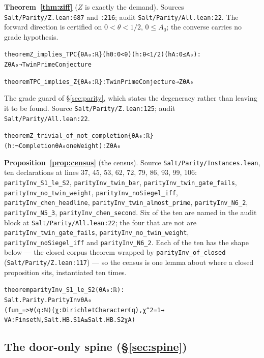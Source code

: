 \documentclass{CUP-JNL-FMP}
\newcommand{\leaninline}[1]{{\small\texttt{#1}}}
\theoremstyle{remark}
\begin{document}
\medskip\noindent\textbf{Theorem~\ref{thm:ziff}} ($Z$ is exactly the demand).
Sources \leaninline{Salt/Parity/Z.lean:687} and \leaninline{:216}; audit
\leaninline{Salt/Parity/All.lean:22}. The forward direction is certified on
$0 < \theta < 1/2$, $0 \le A_0$; the converse carries no grade hypothesis.
{\footnotesize\begin{alltt}
theorem Z_implies_TPC \{θ A₀ : ℝ\} (h0 : 0 < θ) (h : θ < 1 / 2) (hA : 0 ≤ A₀) :
    Z θ A₀ → TwinPrimeConjecture

theorem TPC_implies_Z \{θ A₀ : ℝ\} : TwinPrimeConjecture → Z θ A₀
\end{alltt}}

\medskip\noindent The grade guard of \S\ref{sec:parity}, which states the
degeneracy rather than leaving it to be found. Source
\leaninline{Salt/Parity/Z.lean:125}; audit \leaninline{Salt/Parity/All.lean:22}.
{\footnotesize\begin{alltt}
theorem Z_trivial_of_not_completion \{θ A₀ : ℝ\}
    (h : ¬ Completion θ A₀ oneWeight) : Z θ A₀
\end{alltt}}

\medskip\noindent\textbf{Proposition~\ref{prop:census}} (the census). Source
\leaninline{Salt/Parity/Instances.lean}, ten declarations at lines 37, 45, 53,
62, 72, 79, 86, 93, 99, 106: \leaninline{parityInv\_S1\_le\_S2},
\leaninline{parityInv\_twin\_bar}, \leaninline{parityInv\_twin\_gate\_fails},
\leaninline{parityInv\_no\_twin\_weight}, \leaninline{parityInv\_noSiegel\_iff},
\leaninline{parityInv\_chen\_headline},
\leaninline{parityInv\_twin\_almost\_prime}, \leaninline{parityInv\_N6\_2},
\leaninline{parityInv\_N5\_3}, \leaninline{parityInv\_chen\_second}. Six of the
ten are named in the audit block at \leaninline{Salt/Parity/All.lean:22}; the
four that are not are \leaninline{parityInv\_twin\_gate\_fails},
\leaninline{parityInv\_no\_twin\_weight}, \leaninline{parityInv\_noSiegel\_iff}
and \leaninline{parityInv\_N6\_2}. Each of the ten has the shape below --- the
closed corpus theorem wrapped by \leaninline{parityInv\_of\_closed}
(\leaninline{Salt/Parity/Z.lean:117}) --- so the census is one lemma about where
a closed proposition sits, instantiated ten times.
{\footnotesize\begin{alltt}
theorem parityInv_S1_le_S2 (θ A₀ : ℝ) :
    Salt.Parity.ParityInv θ A₀
      (fun _ => ∀ (q : ℕ) (χ : DirichletCharacter ℂ q), χ ^ 2 = 1 →
        ∀ A : Finset ℕ, Salt.HB.S1 A ≤ Salt.HB.S2 χ A)
\end{alltt}}

\subsection{The door-only spine (\S\ref{sec:spine})}
\end{document}

